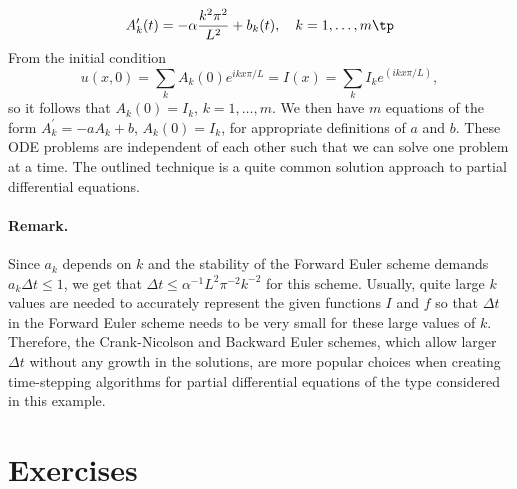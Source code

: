 \documentclass[graybox,sectrefs,envcountresetchap,open=right,final]{svmonodo}
\begin{document}
\[
A_k^{\prime}(t) = -\alpha\frac{k^2\pi^2}{L^2} + b_k(t),\quad k=1,\ldots,m
\tp
\]
From the initial condition
\[ u(x,0)=\sum_k A_k(0)e^{ikx\pi/L}=I(x)=\sum_k I_k e^{(ikx\pi/L)},\]
so it follows that $A_k(0)=I_k$, $k=1,\ldots,m$. We then have $m$
equations of the form $A_k^{\prime}=-a A_k +b$, $A_k(0)=I_k$, for
appropriate definitions of $a$ and $b$. These ODE problems
are independent of each other such that we can solve one problem
at a time. The outlined technique is a quite common solution approach to
partial differential equations.

\paragraph{Remark.}
Since $a_k$ depends on $k$ and the stability of the
Forward Euler scheme demands $a_k\Delta t \leq 1$, we get that $\Delta
t \leq \alpha^{-1}L^2\pi^{-2} k^{-2}$ for this scheme.  Usually, quite
large $k$ values are needed to accurately represent the given
functions $I$ and $f$ so that $\Delta t$ in the Forward Euler scheme
needs to be very small for these large values of $k$.  Therefore, the
Crank-Nicolson and Backward Euler schemes, which allow larger $\Delta
t$ without any growth in the solutions, are more popular choices when
creating time-stepping algorithms for partial differential equations
of the type considered in this example.

\section{Exercises}
\end{document}

